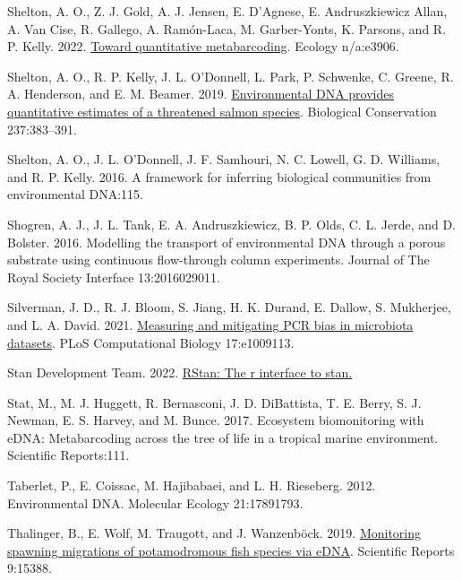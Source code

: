 \documentclass[
]{article}
\newlength{\cslhangindent}
\newlength{\cslentryspacingunit} %
\newenvironment{CSLReferences}[2] %
 {%
  \setlength{\parindent}{0pt}
  \ifodd #1
  \let\oldpar\par
  \def\par{\hangindent=\cslhangindent\oldpar}
  \fi
  \setlength{\parskip}{#2\cslentryspacingunit}
 }%
 {}
\begin{document}
\begin{CSLReferences}{1}{0}
\leavevmode{}%
Shelton, A. O., Z. J. Gold, A. J. Jensen, E. D'Agnese, E. Andruszkiewicz
Allan, A. Van Cise, R. Gallego, A. Ramón-Laca, M. Garber-Yonts, K.
Parsons, and R. P. Kelly. 2022.
\href{https://doi.org/10.1002/ecy.3906}{Toward quantitative
metabarcoding}. Ecology n/a:e3906.

\leavevmode{}%
Shelton, A. O., R. P. Kelly, J. L. O'Donnell, L. Park, P. Schwenke, C.
Greene, R. A. Henderson, and E. M. Beamer. 2019.
\href{https://doi.org/10.1016/j.biocon.2019.07.003}{Environmental DNA
provides quantitative estimates of a threatened salmon species}.
Biological Conservation 237:383--391.

\leavevmode{}%
Shelton, A. O., J. L. O'Donnell, J. F. Samhouri, N. C. Lowell, G. D.
Williams, and R. P. Kelly. 2016. A framework for inferring biological
communities from environmental DNA:115.

\leavevmode{}%
Shogren, A. J., J. L. Tank, E. A. Andruszkiewicz, B. P. Olds, C. L.
Jerde, and D. Bolster. 2016. Modelling the transport of environmental
DNA through a porous substrate using continuous flow-through column
experiments. Journal of The Royal Society Interface 13:2016029011.

\leavevmode{}%
Silverman, J. D., R. J. Bloom, S. Jiang, H. K. Durand, E. Dallow, S.
Mukherjee, and L. A. David. 2021.
\href{https://doi.org/10.1371/journal.pcbi.1009113}{Measuring and
mitigating PCR bias in microbiota datasets}. PLoS Computational Biology
17:e1009113.

\leavevmode{}%
Stan Development Team. 2022. \href{https://mc-stan.org/}{RStan: The r
interface to stan.}

\leavevmode{}%
Stat, M., M. J. Huggett, R. Bernasconi, J. D. DiBattista, T. E. Berry,
S. J. Newman, E. S. Harvey, and M. Bunce. 2017. Ecosystem biomonitoring
with eDNA: Metabarcoding across the tree of life in a tropical marine
environment. Scientific Reports:111.

\leavevmode{}%
Taberlet, P., E. Coissac, M. Hajibabaei, and L. H. Rieseberg. 2012.
Environmental DNA. Molecular Ecology 21:17891793.

\leavevmode{}%
Thalinger, B., E. Wolf, M. Traugott, and J. Wanzenböck. 2019.
\href{https://doi.org/10.1038/s41598-019-51398-0}{Monitoring spawning
migrations of potamodromous fish species via eDNA}. Scientific Reports
9:15388.


\end{CSLReferences}
\end{document}
